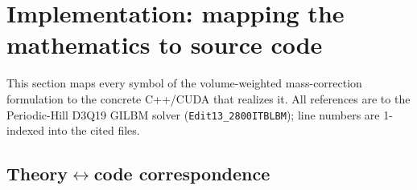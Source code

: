 \documentclass[11pt]{article}
\theoremstyle{definition}
\theoremstyle{remark}
\providecommand{\path}[1]{\texttt{#1}}
\begin{document}
\section{Implementation: mapping the mathematics to source code}
\label{sec:impl}

This section maps every symbol of the volume-weighted mass-correction formulation
to the concrete C++/CUDA that realizes it. All references are to the Periodic-Hill
D3Q19 GILBM solver (\path{Edit13_2800ITBLBM}); line numbers are 1-indexed into the
cited files.

\subsection{Theory\texorpdfstring{$\leftrightarrow$}{<->}code correspondence}
\label{sec:impl:table}
\end{document}
